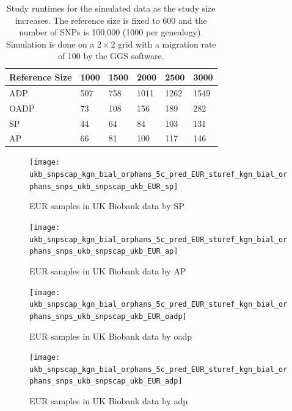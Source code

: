 \documentclass{article}
\begin{document}
\begin{table}
  \centering
  \begin{tabular}{|l|l|l|l|l|l|}
    \hline
    Reference Size & 1000 & 1500 & 2000 & 2500 & 3000 \\
    \hline
    ADP        & 507  & 758 & 1011 & 1262 & 1549 \\
    OADP       &  73  & 108 &  156 &  189 &  282 \\
    SP         &  44  &  64 &   84 &  103 &  131 \\
    AP         &  66  &  81 &  100 &  117 &  146 \\
    \hline
  \end{tabular}
  \caption{
    Study runtimes for the simulated data as the study size increases.
    The reference size is fixed to 600 and the number of SNPs is 100,000 (1000 per genealogy). 
    Simulation is done on a $2 \times 2$ grid with a migration rate of 100 by the GGS software. 
  }
  \label{tbl:mChg-runtimes-study}
\end{table}

\begin{figure}[p]
  \centering
  \texttt{[image: ukb\_snpscap\_kgn\_bial\_orphans\_5c\_pred\_EUR\_sturef\_kgn\_bial\_orphans\_snps\_ukb\_snpscap\_ukb\_EUR\_sp]}
  \caption{EUR samples in UK Biobank data by SP}
\end{figure}


\begin{figure}[p]
  \centering
  \texttt{[image: ukb\_snpscap\_kgn\_bial\_orphans\_5c\_pred\_EUR\_sturef\_kgn\_bial\_orphans\_snps\_ukb\_snpscap\_ukb\_EUR\_ap]}
  \caption{EUR samples in UK Biobank data by AP}
\end{figure}


\begin{figure}[p]
  \centering
  \texttt{[image: ukb\_snpscap\_kgn\_bial\_orphans\_5c\_pred\_EUR\_sturef\_kgn\_bial\_orphans\_snps\_ukb\_snpscap\_ukb\_EUR\_oadp]}
  \caption{EUR samples in UK Biobank data by oadp}
\end{figure}

\begin{figure}[p]
  \centering
  \texttt{[image: ukb\_snpscap\_kgn\_bial\_orphans\_5c\_pred\_EUR\_sturef\_kgn\_bial\_orphans\_snps\_ukb\_snpscap\_ukb\_EUR\_adp]}
  \caption{EUR samples in UK Biobank data by adp}
\end{figure}
\end{document}
